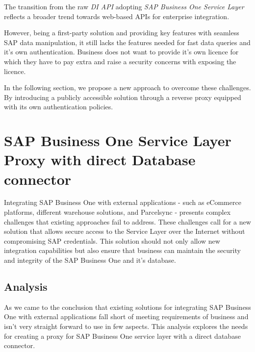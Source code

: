The transition from the raw \textit{DI API} adopting \textit{SAP Business One Service Layer} reflects a broader trend towards web-based APIs for enterprise integration.

However, being a first-party solution and providing key features with seamless SAP data manipulation, it still lacks the features needed for fast data queries and it's own authentication. Business does not want to provide it's own licence for which they have to pay extra and raise a security concerns with exposing the licence.

In the following section, we propose a new approach to overcome these challenges.
By introducing a publicly accessible solution through a reverse proxy equipped with its own authentication policies.

\section{SAP Business One Service Layer Proxy with direct Database connector}
\label{sec:sap-b1-service-layer-proxy}
Integrating SAP Business One with external applications - such as eCommerce platforms, different warehouse solutions, and Parcelsync - presents complex challenges that existing  approaches fail to address. 
These challenges call for a new solution that allows secure access to the Service Layer over the Internet without compromising SAP credentials. 
This solution should not only allow new integration capabilities but also ensure that business can maintain the security and integrity of the SAP Business One and it's database.

\subsection{Analysis}
\label{subsec:analysis}
As we came to the conclusion that existing solutions for integrating SAP Business One with external applications fall short of meeting requirements of business and isn't very straight forward to use in few aspects.
This analysis explores the needs for creating a proxy for SAP Business One service layer with a direct database connector.

